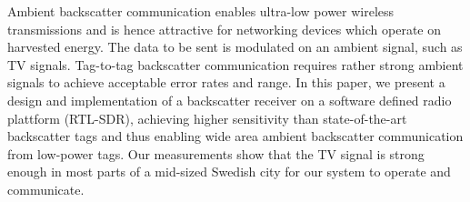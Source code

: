 Ambient backscatter communication enables ultra-low
power wireless transmissions and is hence attractive
for networking devices which operate on harvested energy. 
The data to be sent is modulated on an ambient signal, 
such as TV signals. Tag-to-tag backscatter communication 
requires rather strong ambient signals to achieve acceptable
error rates and range.
In this paper, we present a design and implementation of a
backscatter receiver on a software defined radio plattform 
(RTL-SDR), achieving higher sensitivity than state-of-the-art
backscatter tags and thus enabling wide area ambient backscatter 
communication from low-power tags. 
Our measurements show that the TV signal is strong 
enough in most parts of a mid-sized Swedish city for our
system to operate and communicate. 

